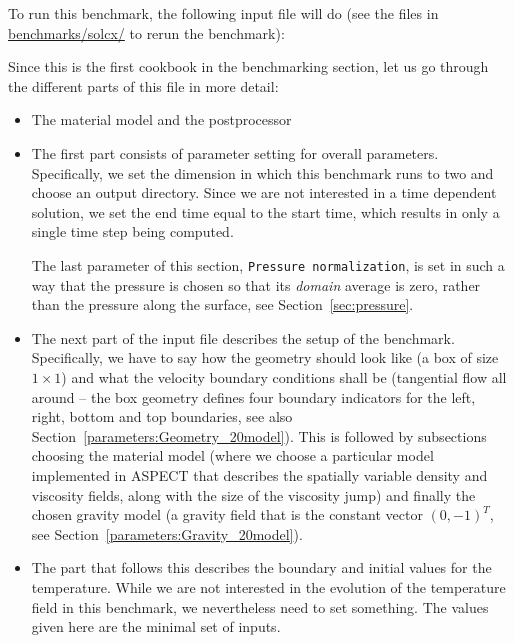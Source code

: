\documentclass{article}
\newcommand{\aspect}{\textsc{ASPECT}}
\begin{document}
To run this benchmark, the following input file will do (see the files in \url{benchmarks/solcx/} to rerun the benchmark):


Since this is the first cookbook in the benchmarking section, let us go
through the different parts of this file in more detail:
\begin{itemize}
\item The material model and the postprocessor 
\item The first part consists of parameter setting for overall
  parameters. Specifically, we set the dimension in which this benchmark runs
  to two and choose an output directory. Since we are not interested in a time
  dependent solution, we set the end time equal to the start time, which
  results in only a single time step being computed.

  The last parameter of this section, \texttt{Pressure normalization},
  is set in such a way that the pressure is chosen so that its \textit{domain}
  average is zero, rather than the pressure along the surface, see
  Section~\ref{sec:pressure}.

\item The next part of the input file describes the setup of the
  benchmark. Specifically, we have to say how the geometry should look like (a
  box of size $1\times 1$) and what the velocity boundary conditions shall be
  (tangential flow all around -- the box geometry defines four boundary
  indicators for the left, right, bottom and top boundaries, see also
  Section~\ref{parameters:Geometry_20model}). This is followed by subsections
  choosing the material model (where we choose a particular model implemented
  in \aspect{} that describes the spatially variable density and viscosity
  fields, along with the size of the viscosity jump) and finally the chosen
  gravity model (a gravity field that is the constant vector $(0,-1)^T$, see
  Section~\ref{parameters:Gravity_20model}).

\item The part that follows this describes the boundary and initial values for
  the temperature. While we are not interested in the evolution of the
  temperature field in this benchmark, we nevertheless need to set
  something. The values given here are the minimal set of inputs.


\end{itemize}
\end{document}
